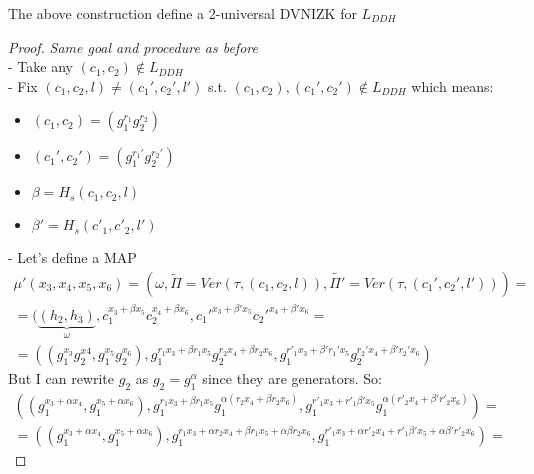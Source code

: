 \begin{theorem}
    The above construction define a 2-universal DVNIZK for $L_{DDH}$    
\end{theorem}
\pagebreak
\begin{proof}
    \textit{Same goal and procedure as before}\\
    - Take any $(c_1,c_2) \notin L_{DDH}$\\
    - Fix $(c_1,c_2,l)\neq (c_1',c_2',l')$ s.t. $(c_1,c_2),(c_1',c_2')\notin L_{DDH}$ which means:
    \begin{itemize}
        \item $(c_1,c_2)=(g_1^{r_1}g_2^{r_2})$ 
        \item $(c_1',c_2')=(g_1^{r_1'}g_2^{r_2'})$ 
        \item $\beta=H_s(c_1,c_2,l)$
        \item $\beta'=H_s(c'_1,c'_2,l')$
    \end{itemize}
    - Let's define a MAP
    \begin{gather*}
        \mu'(x_3,x_4,x_5,x_6)=(\omega, \widetilde{\Pi}=Ver(\tau,(c_1,c_2,l)),\widetilde{\Pi'}=Ver(\tau,(c_1',c_2',l')))= \\
        =(\underbrace{(h_2,h_3)}_{\omega},c_1^{x_3+\beta x_5}c_2^{x_4+\beta x_6},c_1'^{x_3+\beta'x_5}c_2'^{x_4+\beta'x_6}= \\
        =((g_1^{x_3}g_2^{x4},g_1^{x_5}g_2^{x_6}),g_1^{r_1x_3+\beta r_1x_5}g_2^{r_2x_4+\beta r_2x_6},g_1^{r'_1x_3+\beta' r_1'x_5}g_2^{r_2'x_4+\beta'r_2'x_6})
    \end{gather*}
    But I can rewrite $g_2$ as $g_2=g_1^{\alpha}$ since they are generators. So:
    \begin{gather*}
        ((g_1^{x_3+\alpha x_4},g_1^{x_5+\alpha x_6}),g_1^{r_1x_3+\beta r_1x_5}g_1^{\alpha(r_2x_4+\beta r_2x_6)},g_1^{r'_1x_3+r'_1\beta' x_5}g_1^{\alpha(r'_2x_4+\beta' r'_2x_6)})=\\
        = ((g_1^{x_3+\alpha x_4},g_1^{x_5+\alpha x_6}),g_1^{r_1x_3+\alpha r_2x_4+\beta r_1x_5 +\alpha\beta r_2x_6},g_1^{r'_1x_3+ \alpha r'_2x_4 +r'_1\beta' x_5 + \alpha\beta' r'_2x_6})=
    \end{gather*}

\end{proof}
